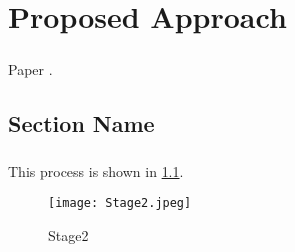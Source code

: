 \chapter{Proposed Approach}
\paragraph{} Paper \cite{paper name}.

\paragraph{}
\section{Section Name}

\paragraph{}


This process is shown in \ref{stage2}.
\begin{figure}
\centering
\texttt{[image: Stage2.jpeg]}\\[0.1in]
\caption{Stage2}
\label{stage2}
\end{figure}
